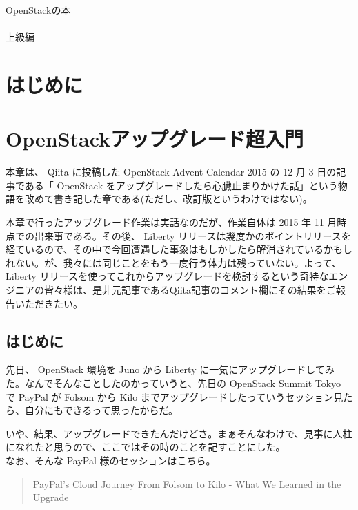 \documentclass[9pt,b5paper,tombo,openany]{jsbook}
\begin{document}
\noindent
{\Huge OpenStackの本\\ \\上級編}

\vspace*{-5mm}
\begin{minipage}{0.4\paperwidth}
	\tableofcontents
\end{minipage}
\thispagestyle{empty}

\chapter{はじめに}

\setcounter{page}{1}

\chapter{OpenStackアップグレード超入門}
本章は、 Qiita に投稿した OpenStack Advent Calendar 2015 の 12 月 3 日の記事である「 OpenStack をアップグレードしたら心臓止まりかけた話」という物語を改めて書き記した章である(ただし、改訂版というわけではない)。

本章で行ったアップグレード作業は実話なのだが、作業自体は 2015 年 11 月時点での出来事である。その後、 Liberty リリースは幾度かのポイントリリースを経ているので、その中で今回遭遇した事象はもしかしたら解消されているかもしれない。が、我々には同じことをもう一度行う体力は残っていない。よって、 Liberty リリースを使ってこれからアップグレードを検討するという奇特なエンジニアの皆々様は、是非元記事であるQiita記事のコメント欄にその結果をご報告いただきたい。

\section{はじめに}
先日、 OpenStack 環境を Juno から Liberty に一気にアップグレードしてみた。なんでそんなことしたのかっていうと、先日の OpenStack Summit Tokyo で PayPal が Folsom から Kilo までアップグレードしたっていうセッション見たら、自分にもできるって思ったからだ。

いや、結果、アップグレードできたんだけどさ。まぁそんなわけで、見事に人柱になれたと思うので、ここではその時のことを記すことにした。\\[1ex]

\noindent
なお、そんな PayPal 様のセッションはこちら。

\begin{quote}
	PayPal's Cloud Journey From Folsom to Kilo - What We Learned in the Upgrade
\end{quote}
\end{document}
